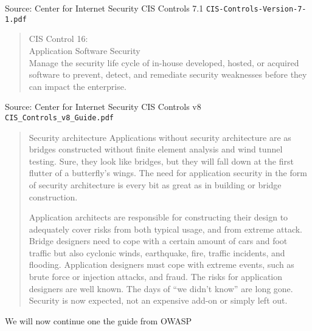 \documentclass[Screen16to9,17pt]{foils}
\begin{document}
Source: Center for Internet Security CIS Controls 7.1 \verb+CIS-Controls-Version-7-1.pdf+

\begin{quote}
CIS Control 16:\\
Application Software Security\\
Manage the security life cycle of in-house developed, hosted,
or acquired software to prevent, detect, and remediate security
weaknesses before they can impact the enterprise.
\end{quote}

Source: Center for Internet Security CIS Controls v8 \verb+CIS_Controls_v8_Guide.pdf+




\begin{quote}\small
Security architecture
Applications without security architecture are as bridges constructed without finite element analysis and wind tunnel testing. Sure, they look like bridges, but they will fall down at the first flutter of a butterfly’s wings. The need for application security in the form of security architecture is every bit as great as in building or bridge construction.

Application architects are responsible for constructing their design to adequately cover risks from both typical usage, and from extreme attack. Bridge designers need to cope with a certain amount of cars and foot traffic but also cyclonic winds, earthquake, fire, traffic incidents, and flooding. Application designers must cope with extreme events, such as brute force or injection attacks, and fraud. The risks for application designers are well known. The days of “we didn’t know” are long gone. Security is now expected, not an expensive add-on or simply left out.
\end{quote}

We will now continue one the guide from OWASP







\slidenext{}
\end{document}
